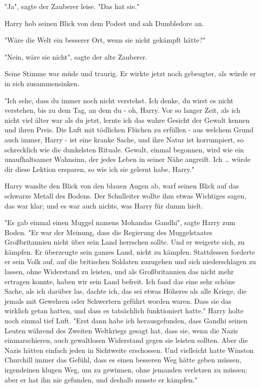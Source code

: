 {"Ja", sagte der Zauberer leise. "Das hat sie."

Harry hob seinen Blick von dem Podest und sah Dumbledore an.

"Wäre die Welt ein besserer Ort, wenn sie nicht gekämpft hätte?"

"Nein, wäre sie nicht", sagte der alte Zauberer.

Seine Stimme war müde und traurig. Er wirkte jetzt noch gebeugter, als würde er in sich zusammensinken.

"Ich sehe, dass du immer noch nicht verstehst. Ich denke, du wirst es nicht verstehen, bis zu dem Tag, an dem du - oh, Harry. Vor so langer Zeit, als ich nicht viel älter war als du jetzt, lernte ich das wahre Gesicht der Gewalt kennen und ihren Preis. Die Luft mit tödlichen Flüchen zu erfüllen - aus welchem Grund auch immer, Harry - ist eine kranke Sache, und ihre Natur ist korrumpiert, so schrecklich wie die dunkelsten Rituale. Gewalt, einmal begonnen, wird wie ein unaufhaltsamer Wahnsinn, der jedes Leben in seiner Nähe angreift. Ich … würde dir diese Lektion ersparen, so wie ich sie gelernt habe, Harry."

Harry wandte den Blick von den blauen Augen ab, warf seinen Blick auf das schwarze Metall des Bodens. Der Schulleiter wollte ihm etwas Wichtiges sagen, das war klar; und es war auch nichts, was Harry für dumm hielt.

"Es gab einmal einen Muggel namens Mohandas Gandhi", sagte Harry zum Boden. "Er war der Meinung, dass die Regierung des Muggelstaates Großbritannien nicht über sein Land herrschen sollte. Und er weigerte sich, zu kämpfen. Er überzeugte sein ganzes Land, nicht zu kämpfen. Stattdessen forderte er sein Volk auf, auf die britischen Soldaten zuzugehen und sich niederschlagen zu lassen, ohne Widerstand zu leisten, und als Großbritannien das nicht mehr ertragen konnte, haben wir sein Land befreit. Ich fand das eine sehr schöne Sache, als ich darüber las, dachte ich, das sei etwas Höheres als alle Kriege, die jemals mit Gewehren oder Schwertern geführt worden waren. Dass sie das wirklich getan hatten, und dass es tatsächlich funktioniert hatte." Harry holte noch einmal tief Luft. "Erst dann habe ich herausgefunden, dass Gandhi seinen Leuten während des Zweiten Weltkriegs gesagt hat, dass sie, wenn die Nazis einmarschieren, auch gewaltlosen Widerstand gegen sie leisten sollten. Aber die Nazis hätten einfach jeden in Sichtweite erschossen. Und vielleicht hatte Winston Churchill immer das Gefühl, dass es einen besseren Weg hätte geben müssen, irgendeinen klugen Weg, um zu gewinnen, ohne jemanden verletzen zu müssen; aber er hat ihn nie gefunden, und deshalb musste er kämpfen."

}
